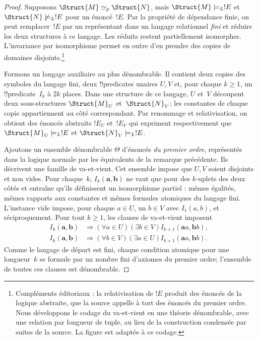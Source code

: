 \documentclass[../../../include/open-logic-section]{subfiles}
\begin{document}
\begin{proof}
Supposons $\Struct{M}\simeq_p\Struct{N}$,
mais $\Struct{M}\models_L !E$ et
$\Struct{N}\not\models_L !E$ pour
un énoncé~$!E$. Par la propriété
de dépendance finie, on peut
remplacer~$!E$ par un représentant
dans un langage relationnel
\emph{fini} et réduire les deux
structures à ce langage. Les
réduits restent partiellement
isomorphes. L'invariance par
isomorphisme permet en outre
d'en prendre des copies de
domaines disjoints.\footnote{Compléments éditoriaux : la relativisation de $!E$ produit des énoncés de la logique abstraite, que la source appelle à tort des énoncés du premier ordre. Nous développons le codage du va-et-vient en une théorie dénombrable, avec une relation par longueur de tuple, au lieu de la construction condensée par suites de la source. La figure est adaptée à ce codage.}

Formons un langage auxiliaire
au plus dénombrable. Il contient
deux copies des symboles du
langage fini, deux !!{predicate}s
unaires $U,V$ et, pour chaque
$k\geq1$, un !!{predicate}~$I_k$
à $2k$ places. Dans une structure
de ce langage, $U$ et~$V$
découpent deux sous-structures
$\Struct{M}_U$ et~$\Struct{N}_V$;
les constantes de chaque copie
appartiennent au côté correspondant.
Par renommage et relativisation,
on obtient des énoncés abstraits
$!E_U$ et~$!E_V$ qui expriment
respectivement que
$\Struct{M}_U\models_L !E$ et
$\Struct{N}_V\models_L !E$.

Ajoutons un ensemble dénombrable
$\Theta$ d'énoncés \emph{du premier
ordre}, représentés dans la logique
normale par les équivalents de la
remarque précédente. Ils décrivent
une famille de
va-et-vient. Cet ensemble impose que $U,V$
soient disjoints et non vides.
Pour chaque~$k$, $I_k(\mathbf a,
\mathbf b)$ ne vaut que pour des
$k$-uplets des deux côtés et
entraîne qu'ils définissent un
isomorphisme partiel : mêmes
égalités, mêmes rapports aux
constantes et mêmes formules
atomiques du langage fini.
L'instance vide impose, pour
chaque $a\in U$, un $b\in V$
avec $I_1(a,b)$, et réciproquement.
Pour tout $k\geq1$, les clauses
de va-et-vient imposent
\[
\begin{aligned}
I_k(\mathbf a,\mathbf b)
&\Longrightarrow
  (\forall a\in U)(\exists b\in V)
  I_{k+1}(\mathbf a a,\mathbf b b),\\
I_k(\mathbf a,\mathbf b)
&\Longrightarrow
  (\forall b\in V)(\exists a\in U)
  I_{k+1}(\mathbf a a,\mathbf b b).
\end{aligned}
\]
Comme le langage de départ est
fini, chaque condition atomique
pour une longueur~$k$ se formule
par un nombre fini d'axiomes
du premier ordre; l'ensemble de
toutes ces clauses est dénombrable.


\end{proof}
\end{document}

